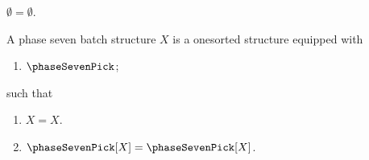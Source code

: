 \begin{axiom}\label{phase7_batch_prefix}
    $\emptyset = \emptyset$.
\end{axiom}

\begin{struct}\label{phase7_batch_structure}
    A phase seven batch structure $X$ is a onesorted structure equipped with
    \begin{enumerate}
        \item $\phaseSevenPick$;
    \end{enumerate}
    such that
    \begin{enumerate}
        \item\label{phase7_batch_first} $X = X$.
        \item\label{phase7_batch_second}
            $\phaseSevenPick[X] = \phaseSevenPick[X]$.
    \end{enumerate}
\end{struct}

